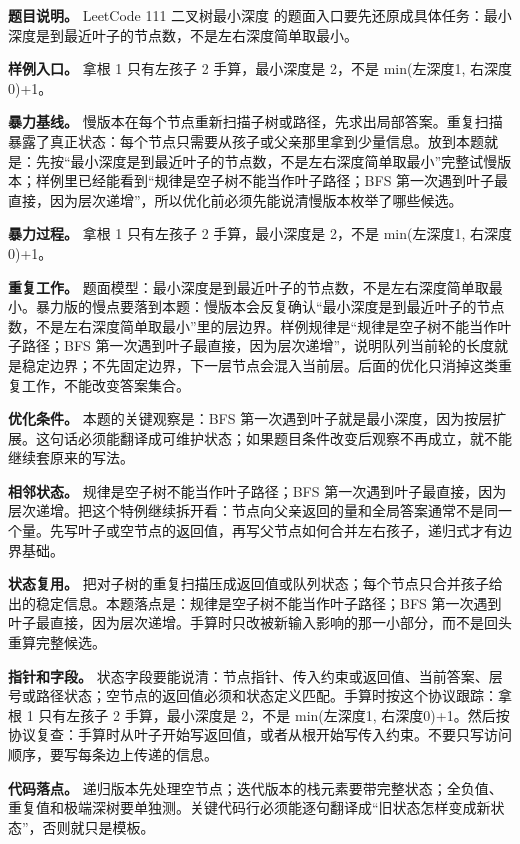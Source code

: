 \textbf{题目说明。} LeetCode 111 二叉树最小深度 的题面入口要先还原成具体任务：最小深度是到最近叶子的节点数，不是左右深度简单取最小。

\textbf{样例入口。} 拿根 1 只有左孩子 2 手算，最小深度是 2，不是 min(左深度1, 右深度0)+1。

\textbf{暴力基线。} 慢版本在每个节点重新扫描子树或路径，先求出局部答案。重复扫描暴露了真正状态：每个节点只需要从孩子或父亲那里拿到少量信息。放到本题就是：先按“最小深度是到最近叶子的节点数，不是左右深度简单取最小”完整试慢版本；样例里已经能看到“规律是空子树不能当作叶子路径；BFS 第一次遇到叶子最直接，因为层次递增”，所以优化前必须先能说清慢版本枚举了哪些候选。

\textbf{暴力过程。} 拿根 1 只有左孩子 2 手算，最小深度是 2，不是 min(左深度1, 右深度0)+1。

\textbf{重复工作。} 题面模型：最小深度是到最近叶子的节点数，不是左右深度简单取最小。暴力版的慢点要落到本题：慢版本会反复确认“最小深度是到最近叶子的节点数，不是左右深度简单取最小”里的层边界。样例规律是“规律是空子树不能当作叶子路径；BFS 第一次遇到叶子最直接，因为层次递增”，说明队列当前轮的长度就是稳定边界；不先固定边界，下一层节点会混入当前层。后面的优化只消掉这类重复工作，不能改变答案集合。

\textbf{优化条件。} 本题的关键观察是：BFS 第一次遇到叶子就是最小深度，因为按层扩展。这句话必须能翻译成可维护状态；如果题目条件改变后观察不再成立，就不能继续套原来的写法。

\textbf{相邻状态。} 规律是空子树不能当作叶子路径；BFS 第一次遇到叶子最直接，因为层次递增。把这个特例继续拆开看：节点向父亲返回的量和全局答案通常不是同一个量。先写叶子或空节点的返回值，再写父节点如何合并左右孩子，递归式才有边界基础。

\textbf{状态复用。} 把对子树的重复扫描压成返回值或队列状态；每个节点只合并孩子给出的稳定信息。本题落点是：规律是空子树不能当作叶子路径；BFS 第一次遇到叶子最直接，因为层次递增。手算时只改被新输入影响的那一小部分，而不是回头重算完整候选。

\textbf{指针和字段。} 状态字段要能说清：节点指针、传入约束或返回值、当前答案、层号或路径状态；空节点的返回值必须和状态定义匹配。手算时按这个协议跟踪：拿根 1 只有左孩子 2 手算，最小深度是 2，不是 min(左深度1, 右深度0)+1。然后按协议复查：手算时从叶子开始写返回值，或者从根开始写传入约束。不要只写访问顺序，要写每条边上传递的信息。

\textbf{代码落点。} 递归版本先处理空节点；迭代版本的栈元素要带完整状态；全负值、重复值和极端深树要单独测。关键代码行必须能逐句翻译成“旧状态怎样变成新状态”，否则就只是模板。

